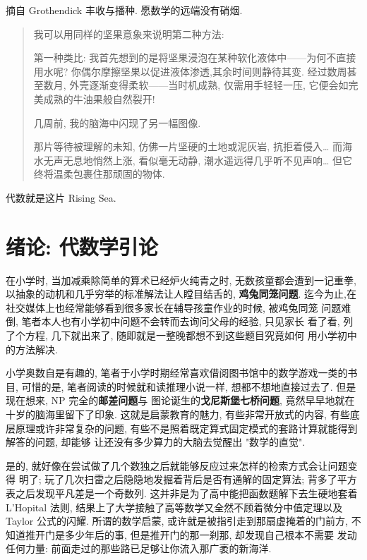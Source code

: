 \documentclass[UTF8]{book}
\begin{document}
\vspace*{5em}

摘自 Grothendick 丰收与播种. 愿数学的远端没有硝烟. 

\begin{quotation}
    
    \kaishu   
    我可以用同样的坚果意象来说明第二种方法: 
    
    第一种类比: 
    我首先想到的是将坚果浸泡在某种软化液体中——为何不直接用水呢? 
    你偶尔摩擦坚果以促进液体渗透,其余时间则静待其变. 
    经过数周甚至数月, 外壳逐渐变得柔软——当时机成熟, 仅需用手轻轻一压, 
    它便会如完美成熟的牛油果般自然裂开! 

    几周前, 我的脑海中闪现了另一幅图像. 
      
    那片等待被理解的未知, 仿佛一片坚硬的土地或泥灰岩, 抗拒着侵入\dots
    而海水无声无息地悄然上涨, 看似毫无动静, 潮水遥远得几乎听不见声响\dots 
    但它终将温柔包裹住那顽固的物体. 
    
\end{quotation}

代数就是这片 Rising Sea. 

\chapter{绪论: 代数学引论}


在小学时, 当加减乘除简单的算术已经炉火纯青之时, 无数孩童都会遭到一记重拳, 
以抽象的动机和几乎穷举的标准解法让人瞠目结舌的, \textbf{鸡兔同笼问题}. 
迄今为止,在社交媒体上也经常能够看到很多家长在辅导孩童作业的时候, 被鸡兔同笼
问题难倒, 笔者本人也有小学初中问题不会转而去询问父母的经验, 只见家长
看了看, 列了个方程, 几下就出来了, 随即就是一整晚都想不到这些题目究竟如何
用小学初中的方法解决. 

小学奥数自是有趣的, 笔者于小学时期经常喜欢借阅图书馆中的数学游戏一类的书目, 
可惜的是, 笔者阅读的时候就和读推理小说一样, 想都不想地直接过去了. 
但是现在想来, NP 完全的\textbf{邮差问题}与
图论诞生的\textbf{戈尼斯堡七桥问题}, 竟然早早地就在
十岁的脑海里留下了印象. 
这就是启蒙教育的魅力, 有些非常开放式的内容, 有些底层原理或许非常复杂的问题, 
有些不是照着既定算式固定模式的套路计算就能得到解答的问题, 却能够
让还没有多少算力的大脑去觉醒出 "数学的直觉". 

是的, 就好像在尝试做了几个数独之后就能够反应过来怎样的检索方式会让问题变得
明了; 玩了几次扫雷之后隐隐地发掘着背后是否有通解的固定算法; 
背多了平方表之后发现平凡差是一个奇数列. 
这并非是为了高中能把函数题解下去生硬地套着 L'Hopital 法则, 
结果上了大学接触了高等数学又全然不顾着微分中值定理以及 Taylor 公式的闪耀. 
所谓的数学启蒙, 或许就是被指引走到那扇虚掩着的门前方, 
不知道推开门是多少年后的事, 但是推开门的那一刹那, 却发现自己根本不需要
发动任何力量: 前面走过的那些路已足够让你流入那广袤的新海洋. 
\end{document}
